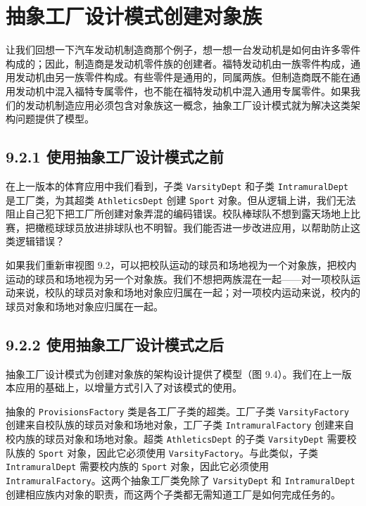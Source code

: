 \section{抽象工厂设计模式创建对象族}

让我们回想一下汽车发动机制造商那个例子，想一想一台发动机是如何由许多零件构成的；因此，制造商是发动机零件族的创建者。福特发动机由一族零件构成，通用发动机由另一族零件构成。有些零件是通用的，同属两族。但制造商既不能在通用发动机中混入福特专属零件，也不能在福特发动机中混入通用专属零件。如果我们的发动机制造应用必须包含对象族这一概念，抽象工厂设计模式就为解决这类架构问题提供了模型。

\subsection{9.2.1 使用抽象工厂设计模式之前}

在上一版本的体育应用中我们看到，子类 \texttt{Varsity\allowbreak{}Dept} 和子类 \texttt{Intramural\allowbreak{}Dept} 是工厂类，为其超类 \texttt{Athletics\allowbreak{}Dept} 创建 \texttt{Sport} 对象。但从逻辑上讲，我们无法阻止自己犯下把工厂所创建对象弄混的编码错误。校队棒球队不想到露天场地上比赛，把橄榄球球员放进排球队也不明智。我们能否进一步改进应用，以帮助防止这类逻辑错误？

如果我们重新审视图 9.2，可以把校队运动的球员和场地视为一个对象族，把校内运动的球员和场地视为另一个对象族。我们不想把两族混在一起——对一项校队运动来说，校队的球员对象和场地对象应归属在一起；对一项校内运动来说，校内的球员对象和场地对象应归属在一起。

\subsection{9.2.2 使用抽象工厂设计模式之后}

抽象工厂设计模式为创建对象族的架构设计提供了模型（图 9.4）。我们在上一版本应用的基础上，以增量方式引入了对该模式的使用。

抽象的 \texttt{Provisions\allowbreak{}Factory} 类是各工厂子类的超类。工厂子类 \texttt{Varsity\allowbreak{}Factory} 创建来自校队族的球员对象和场地对象，工厂子类 \texttt{Intramural\allowbreak{}Factory} 创建来自校内族的球员对象和场地对象。超类 \texttt{Athletics\allowbreak{}Dept} 的子类 \texttt{Varsity\allowbreak{}Dept} 需要校队族的 \texttt{Sport} 对象，因此它必须使用 \texttt{Varsity\allowbreak{}Factory}。与此类似，子类 \texttt{Intramural\allowbreak{}Dept} 需要校内族的 \texttt{Sport} 对象，因此它必须使用 \texttt{Intramural\allowbreak{}Factory}。这两个抽象工厂类免除了 \texttt{Varsity\allowbreak{}Dept} 和 \texttt{Intramural\allowbreak{}Dept} 创建相应族内对象的职责，而这两个子类都无需知道工厂是如何完成任务的。

